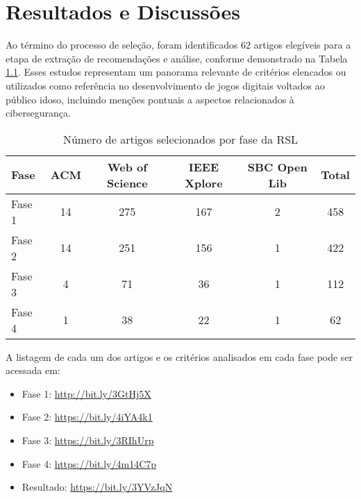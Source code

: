 \chapter{Resultados e Discussões}
\label{cap:resultados}

Ao término do processo de seleção, foram identificados 62 artigos elegíveis para a etapa de extração de recomendações e análise, conforme demonstrado na Tabela \ref{tab:selecao_artigos}. Esses estudos representam um panorama relevante de critérios elencados ou utilizados como referência no desenvolvimento de jogos digitais voltados ao público idoso, incluindo menções pontuais a aspectos relacionados à cibersegurança.

\begin{table}[H]
\centering
\caption{Número de artigos selecionados por fase da RSL}
\label{tab:selecao_artigos}
\begin{tabular}{lcccc|c}
\hline
\textbf{Fase} & \textbf{ACM} & \textbf{Web of Science} & \textbf{IEEE Xplore} & \textbf{SBC Open Lib} & \textbf{Total} \\ \hline
Fase 1        & 14           & 275                     & 167                  & 2                    & 458            \\
Fase 2        & 14           & 251                     & 156                  & 1                    & 422            \\
Fase 3        & 4            & 71                      & 36                   & 1                    & 112            \\
Fase 4        & 1            & 38                      & 22                   & 1                    & 62               \\ \hline
\end{tabular}
\end{table}

A listagem de cada um dos artigos e os critérios analisados em cada fase pode ser acessada em:
\begin{itemize}
    \item Fase 1: \href{http://bit.ly/3GtHj5X}{http://bit.ly/3GtHj5X}
    \item Fase 2: \href{https://bit.ly/4iYA4k1}{https://bit.ly/4iYA4k1}
    \item Fase 3: \href{https://bit.ly/3RIhUrp}{https://bit.ly/3RIhUrp}
    \item Fase 4: \href{https://bit.ly/4m14C7p}{https://bit.ly/4m14C7p}
    \item Resultado: \href{https://bit.ly/3YVzJqN}{https://bit.ly/3YVzJqN}
\end{itemize}

